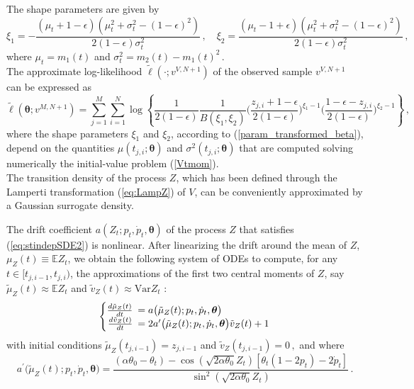 \documentclass[11pt]{article}
\theoremstyle{definition}
\begin{document}
The shape parameters are given by
\begin{equation}
\xi_1 = - \frac{(\mu_t + 1 - \epsilon)(\mu_t^2 + \sigma_t^2 - (1- \epsilon)^2)}{2 (1 - \epsilon) \sigma_t^2}\,, \quad \xi_2=  \frac{(\mu_t-1 + \epsilon )(\mu_t^2 + \sigma_t^2 - (1- \epsilon)^2)}{2 (1 - \epsilon) \sigma_t^2} \,, \label{param_transformed_beta}
\end{equation}
where $\mu_t = m_1 (t)$ and $\sigma_t^2= m_2 (t)- m_1 (t)^2\,.$ \\

The approximate log-likelihood $\tilde{\ell}(\cdot ; v^{V, N+1})$ of the observed sample $v^{V, N+1}$ can be expressed as 
\begin{equation}
 \tilde{\ell} (\bm{\theta}; v^{M,N +1}) = \sum_{j=1}^M \sum_{i=1}^N \log  \left\{ \frac{1}{2(1 - \epsilon)} \frac{1}{B(\xi_1, \xi_2)} \Big( \frac{z_{j,i} + 1 - \epsilon}{2(1 - \epsilon)} \Big)^{\xi_1 -1}  \Big( \frac{1 - \epsilon - z_{j,i}}{2(1 - \epsilon)} \Big)^{\xi_2 -1} \right\} \,,
\label{loglikelihoodV}
\end{equation}
where the shape parameters $\xi_1$ and $\xi_2$, according to (\ref{param_transformed_beta}), depend on the quantities $\mu(t_{j,i};\bm{\theta} )$ and $\sigma^2(t_{j,i};\bm{\theta} )$ that are computed solving numerically the initial-value problem (\ref{Vtmom}). \\

The transition density of the process $Z$, which has been defined through the Lamperti transformation (\ref{eq:LampZ}) of $V$, can be conveniently approximated by a Gaussian surrogate density. 

The drift coefficient $a(Z_t; p_t, \dot{p}_t, \bm{\theta}) $ of the process $Z$ that satisfies (\ref{eq:stindepSDE2}) is nonlinear. After linearizing the drift around the mean of $Z$, $\mu_Z(t) \equiv \mathbb{E}Z_t$,  we obtain the following system of ODEs to compute, for any $t\in [t_{j,i-1}, t_{j, i})$, the approximations of the first two central moments of $Z$, say  $\tilde{\mu}_Z(t) \approx \mathbb{E}Z_t$ and $\tilde{v}_Z(t) \approx \text{Var} Z_t$ :\\
\begin{equation}
  \left\{
  \begin{array}{@{}rl@{}}
    \frac{d \tilde{\mu}_Z (t)}{dt} \!\!\!&=  a\big( \tilde{\mu}_Z (t) ; p_t, \dot{p}_t, \bm{\theta} \big)   \\
    \frac{d \tilde{v}_Z (t)}{dt}  \!\!\!&= 2  a^{\prime} \big( \tilde{\mu}_Z (t) ; p_t, \dot{p}_t, \bm{\theta} \big) \tilde{v}_Z (t) + 1
 \end{array}\right.  \label{Ztmom}
\end{equation}
with initial conditions $\tilde{\mu}_Z(t_{j,i-1})= z_{j, i-1}$ and $\tilde{v}_Z(t_{j,i-1})= 0 \,,$ and where 
\begin{equation*}
a^{\prime} \big( \tilde{\mu}_Z (t) ; p_t, \dot{p}_t, \bm{\theta} \big) =    \frac{  (\alpha \theta_0 - \theta_t)  - \cos(\sqrt{2 \alpha \theta_0 } Z_t) [ \theta_t (1 - 2 p_t) - 2  \dot{p}_t ] }{\sin^2{(\sqrt{2 \alpha \theta_0} Z_t)}} \,.
\end{equation*}
\end{document}

